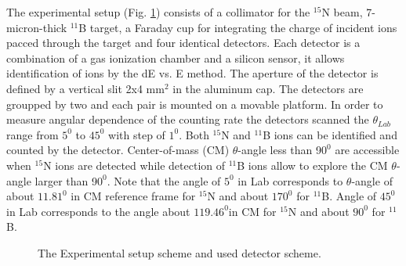 \documentclass[%
 aip,
cp,  %
 amsmath,amssymb,%
 reprint,%
]{revtex4-2}
\begin{document}
The experimental setup (Fig. \ref{ris:fig1}) consists of a collimator for the ${}^{15}$N beam, 7-micron-thick ${}^{11}$B target, a Faraday cup for integrating the charge of incident ions pacced through the target and four identical detectors. Each detector is a combination of a gas ionization chamber and a silicon sensor, it allows identification of ions by the dE vs. E method. The aperture of the detector is defined by a vertical slit 2x4 mm$^2$ in the aluminum cap. The detectors are groupped by two and each pair is mounted on a movable platform. In order to measure angular dependence of the counting rate the detectors scanned the $\theta_{Lab}$ range  from $5 ^0$ to $45 ^0$ with step of $1^0$. Both ${}^{15}$N and ${}^{11}$B ions can be identified and counted by the detector. Center-of-mass (CM) $\theta$-angle less than 9$0^0$  are accessible when ${}^{15}$N ions are detected while detection of ${}^{11}$B ions allow to explore the CM $\theta$-angle larger than 9$0^0$. Note that the angle of $5 ^0$ in Lab corresponds to $\theta$-angle of about ${11.81}^0$ in CM reference frame for $^{15}$N and about ${170}^0$ for $^{11}$B. Angle of $45 ^0$ in Lab corresponds to the angle about ${119.46}^{0}$in CM for $^{15}$N and about ${90}^0$ for ${}^{11}$B.




\begin{figure}[h]
\caption{The Experimental setup scheme and used detector scheme.}
\label{ris:fig1}
\end{figure}

\end{document}
